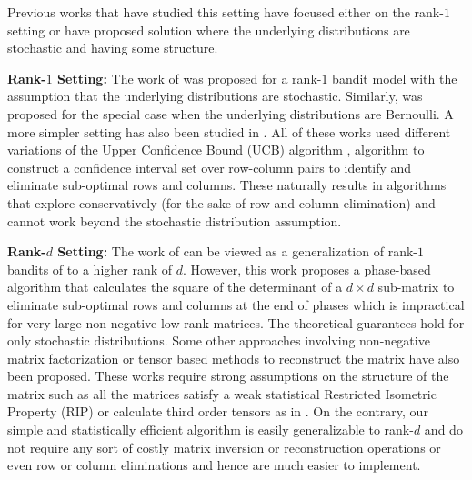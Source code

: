 Previous works that have studied this setting have focused either on the rank-$1$ setting or have proposed solution where the underlying distributions are stochastic and having some structure.

\textbf{Rank-$1$ Setting:} The work of \citet{katariya2016stochastic} was proposed for a rank-$1$ bandit model with the assumption that the underlying distributions are stochastic. Similarly, \citet{katariya2017bernoulli} was proposed for the special case when the underlying distributions are Bernoulli.  A more simpler setting has also been studied in \citet{maillard2014latent}. All of these works used different variations of the Upper Confidence Bound (UCB) algorithm \cite{auer2002finite}, \citep{auer2010ucb} algorithm to construct a confidence interval set over row-column pairs to identify and eliminate sub-optimal rows and columns. These naturally results in algorithms that explore conservatively (for the sake of row and column elimination) and cannot work beyond the stochastic distribution assumption. 



\textbf{Rank-$d$ Setting:} The work of \citet{kveton2017stochastic} can be viewed as a generalization of rank-$1$ bandits of \citet{katariya2016stochastic} to a higher rank of $d$. However, this work proposes a phase-based algorithm that calculates the square of the determinant of a $d\times d$ sub-matrix to eliminate sub-optimal rows and columns at the end of phases which is impractical for very large non-negative low-rank matrices. The theoretical guarantees hold for only stochastic distributions. Some other approaches involving non-negative matrix factorization \citet{sen2016contextual} or tensor based methods \citep{gopalan2016low} to reconstruct the matrix have also been proposed. These works require strong assumptions on the structure of the matrix such as all the matrices satisfy a weak statistical Restricted Isometric Property (RIP) or calculate third order tensors as in \citet{anandkumar2014tensor}. On the contrary, our simple and statistically efficient algorithm is easily generalizable to rank-$d$ and do not require any sort of costly matrix inversion or reconstruction operations or even row or column eliminations and hence are much easier to implement. 

